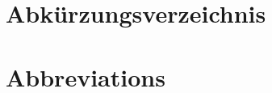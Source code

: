 \ifmmtlanguagegerman
\section*{Abkürzungsverzeichnis}
\else
\section*{Abbreviations}
\fi

%
\begin{acronym}
\end{acronym}
